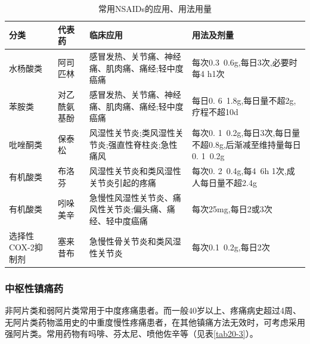 \begin{table}[ht]
    \caption{常用NSAIDs的应用、用法用量}
    \label{tab20-2}
    \centering
    \begin{tabular}{p{4cm}lp{4cm}p{4cm}}
    \toprule
    分类 & 代表药 & 临床应用 & 用法及剂量\\
    \midrule
水杨酸类&  阿司匹林&感冒发热、关节痛、神经痛、肌肉痛、痛经;轻中度癌痛&每次0.3~0.6g,每日3次,必要时每4 h1次\\
苯胺类 & 对乙酰氨基酚&感冒发热、关节痛、神经痛、肌肉痛、痛经;轻中度癌痛&每日0. 6~1.8g,每日量不超2g,疗程不超10d\\
吡唑酮类 & 保泰松&风湿性关节炎;类风湿性关节炎;强直性脊柱炎;急性痛风&每次0. 1~0.2g,每日3次,每日量不超0.8g,后渐减至维持量每日0. 1~0.2g\\
有机酸类 & 布洛芬&风湿性关节炎和类风湿性关节炎引起的疼痛&每次0. 2~0.4g,每4~6h 1次,成人每日量不超2.4g\\
有机酸类 &吲哚美辛&急慢性风湿性关节炎、痛风性关节炎;偏头痛、痛经、轻中度癌痛&每次25mg,每日2或3次\\
选择性COX-2抑制剂&塞来昔布&  急慢性骨关节炎和类风湿性关节炎&每次0.1~0.2g,每日2次\\
    \bottomrule
    \end{tabular}
\end{table}

\subsubsection{中枢性镇痛药}

非阿片类和弱阿片类常用于中度疼痛患者。而一般40岁以上、疼痛病史超过4周、无阿片类药物滥用史的中重度慢性疼痛患者，在其他镇痛方法无效时，可考虑采用强阿片类。常用药物有吗啡、芬太尼、喷他佐辛等（见表\ref{tab20-3}）。

